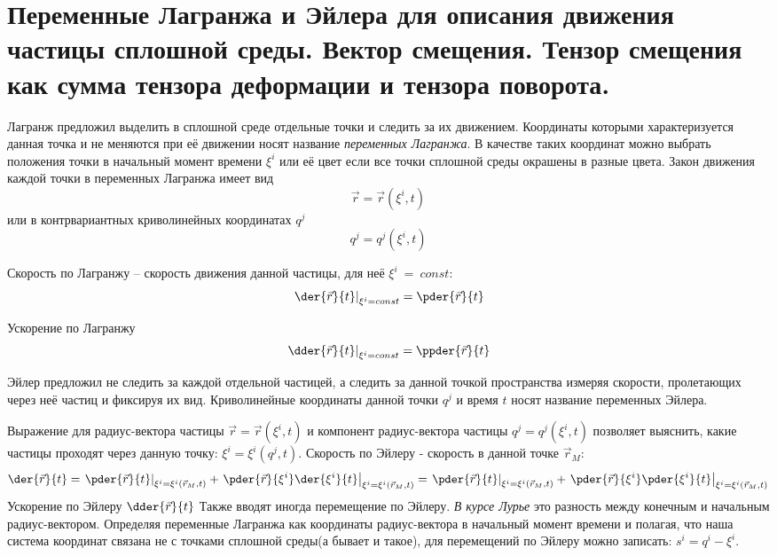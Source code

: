 \chapter{Переменные Лагранжа и Эйлера для описания движения частицы сплошной
среды. Вектор смещения. Тензор смещения как сумма тензора деформации и тензора
поворота.}

Лагранж предложил выделить в сплошной среде отдельные точки и следить за их
движением. Координаты которыми характеризуется данная точка и не меняются при
её движении носят название \emph{переменных Лагранжа}. В качестве таких
координат можно выбрать положения точки в начальный момент времени \( \xi^i \)
или её цвет если все точки сплошной среды окрашены в разные цвета.
Закон движения каждой точки в переменных Лагранжа имеет вид
\[
    \vec{r} = \vec{r}(\xi^i, t)
\] 
или в контрвариантных криволинейных координатах \( q^j \)
\[
    q^j = q^j(\xi^i, t)
\]

Скорость по Лагранжу -- скорость движения данной частицы, для неё
\( \xi^i~=~const \):
\[
    \left.\der{\vec{r}}{t}\right|_{\xi^i = const} = \pder{\vec{r}}{t}
\]

Ускорение по Лагранжу   
\[
    \left.\dder{\vec{r}}{t}\right|_{\xi^i = const} = \ppder{\vec{r}}{t}   
\]
        
Эйлер предложил не следить за каждой отдельной частицей, а следить за данной
точкой пространства измеряя скорости, пролетающих через неё частиц и фиксируя
их вид. Криволинейные координаты данной точки \( q^j \)  и время \( t \) носят
название переменных Эйлера.

Выражение для радиус-вектора частицы \( \vec{r} = \vec{r}(\xi^i, t) \) и
компонент радиус-вектора частицы \( q^j = q^j (\xi^i, t) \) позволяет выяснить,
какие частицы проходят через данную точку: \( \xi^i = \xi^i(q^j, t) \).
Скорость по Эйлеру - скорость в данной точке \( \vec{r}_{M} \):
\[
    \der{\vec{r}}{t} = 
    \left.\pder{\vec{r}}{t}\right|_{\xi^i = \xi^i(\vec{r}_{M}, t)} +
    \left.\pder{\vec{r}}{\xi^i}
    \der{\xi^i}{t}\right|_{\xi^i = \xi^i(\vec{r}_{M}, t)} =
    \left.\pder{\vec{r}}{t}\right|_{\xi^i = \xi^i(\vec{r}_{M}, t)} +
    \left.\pder{\vec{r}}{\xi^i}
    \pder{\xi^i}{t}\right|_{\xi^i = \xi^i(\vec{r}_{M}, t)}
\]
Ускорение по Эйлеру \( \dder{\vec{r}}{t} \)
Также вводят иногда перемещение по Эйлеру. \emph{В курсе Лурье} это разность
между конечным и начальным радиус-вектором. Определяя переменные Лагранжа как
координаты радиус-вектора в начальный момент времени и полагая, что наша
система координат связана не с точками сплошной среды(а бывает и такое), для
перемещений по Эйлеру можно записать: \( s^i = q^i - \xi^i \).
    
